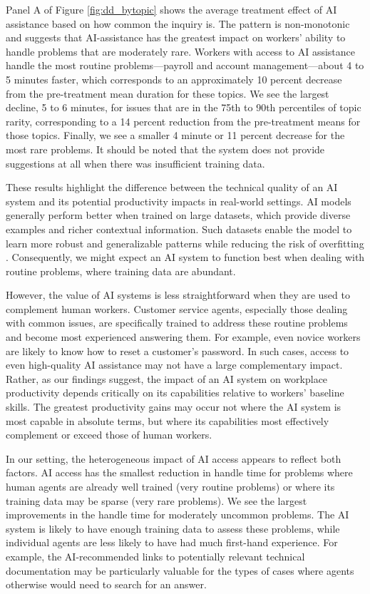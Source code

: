 \documentclass[11pt]{article}
\begin{document}
Panel A of Figure \ref{fig:dd_bytopic} shows the average treatment effect of AI assistance based on how common the inquiry is.  The pattern is non-monotonic and suggests that AI-assistance has the greatest impact on workers' ability to handle problems that are moderately rare.  Workers with access to AI assistance handle the most routine problems---payroll and account management---about 4 to 5 minutes faster, which corresponds to an approximately 10 percent decrease from the pre-treatment mean duration for these topics.   We see the largest decline, 5 to 6 minutes, for issues that are in the 75th to 90th percentiles of topic rarity, corresponding to a 14 percent reduction from the pre-treatment means for those topics.  Finally, we see a smaller 4 minute or 11 percent decrease for the most rare problems.  It should be noted that the system does not provide suggestions at all when there was insufficient training data.  

These results highlight the difference between the technical quality of an AI system and its potential productivity impacts in real-world settings. AI models generally perform better when trained on large datasets, which provide diverse examples and richer contextual information. Such datasets enable the model to learn more robust and generalizable patterns while reducing the risk of overfitting \citep{halevy2009}.  Consequently, we might expect an AI system to function best when dealing with routine problems, where training data are abundant. 

However, the value of AI systems is less straightforward when they are used to complement human workers.  Customer service agents, especially those dealing with common issues, are specifically trained to address these routine problems and become most experienced answering them. For example, even novice workers are likely to know how to reset a customer's password.  In such cases, access to even high-quality AI assistance may not have a large complementary impact. Rather, as our findings suggest, the impact of an AI system on workplace productivity depends critically on its capabilities relative to workers' baseline skills. The greatest productivity gains may occur not where the AI system is most capable in absolute terms, but where its capabilities most effectively complement or exceed those of human workers.

In our setting, the heterogeneous impact of AI access appears to reflect both factors. AI access has the smallest reduction in handle time for problems where human agents are already well trained (very routine problems) or where its training data may be sparse (very rare problems).  We see the largest improvements in the handle time for moderately uncommon problems.  The AI system is likely to have enough training data to assess these problems, while individual agents are less likely to have had much first-hand experience.  For example, the AI-recommended links to potentially relevant technical documentation may be particularly valuable for the types of cases where agents otherwise would need to search for an answer. 
\end{document}
